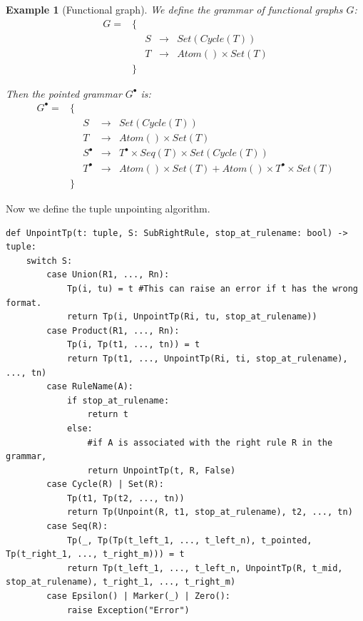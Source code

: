 \documentclass{article}
\newtheorem{example}{Example}
\begin{document}
\begin{example}[Functional graph]
We define the grammar of functional graphs $G$:
\begin{align*}
G = &\{&\\
&&S &\rightarrow& Set(Cycle(T))\\
&&T &\rightarrow& Atom() \times Set(T)\\
&\}&
\end{align*}

Then the pointed grammar $G^{\bullet}$ is:
\begin{align*}
G^{\bullet} = &\{&\\
&&S &\rightarrow& Set(Cycle(T))\\
&&T &\rightarrow& Atom() \times Set(T)\\
&&S^{\bullet} &\rightarrow& T^{\bullet} \times Seq(T) \times Set(Cycle(T))\\
&&T^{\bullet} &\rightarrow& Atom() \times Set(T) + Atom() \times T^{\bullet} \times Set(T)\\
&\}&
\end{align*}

\end{example}

Now we define the tuple unpointing algorithm.

\begin{lstlisting}
def UnpointTp(t: tuple, S: SubRightRule, stop_at_rulename: bool) -> tuple:
	switch S:
		case Union(R1, ..., Rn):
			Tp(i, tu) = t #This can raise an error if t has the wrong format.
			return Tp(i, UnpointTp(Ri, tu, stop_at_rulename))
		case Product(R1, ..., Rn):
			Tp(i, Tp(t1, ..., tn)) = t
			return Tp(t1, ..., UnpointTp(Ri, ti, stop_at_rulename), ..., tn)
		case RuleName(A):
			if stop_at_rulename:
				return t
			else:
				#if A is associated with the right rule R in the grammar,
				return UnpointTp(t, R, False)
		case Cycle(R) | Set(R):
			Tp(t1, Tp(t2, ..., tn))
			return Tp(Unpoint(R, t1, stop_at_rulename), t2, ..., tn)
		case Seq(R):
			Tp(_, Tp(Tp(t_left_1, ..., t_left_n), t_pointed, Tp(t_right_1, ..., t_right_m))) = t
			return Tp(t_left_1, ..., t_left_n, UnpointTp(R, t_mid, stop_at_rulename), t_right_1, ..., t_right_m)
		case Epsilon() | Marker(_) | Zero():
			raise Exception("Error")
\end{lstlisting}
\end{document}
